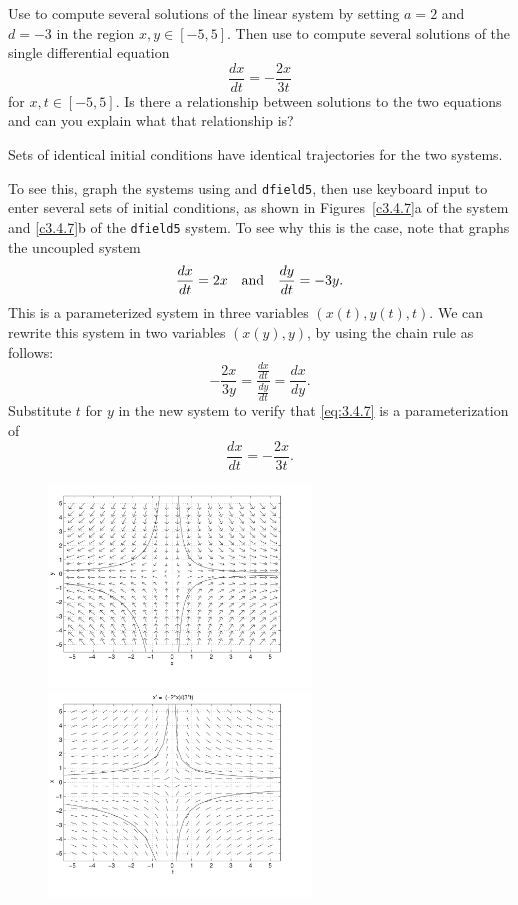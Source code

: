 \documentclass{ximera}
\begin{document}
\begin{computerExercise} \label{c3.4.7}
Use {\pplane} to compute several solutions of the linear system by
setting $a=2$ and $d=-3$ in the region $x,y\in[-5,5]$.  Then use
{\dfield} to compute several solutions of the single differential
equation
\[
\frac{dx}{dt} = -\frac{2x}{3t}
\]
for $x,t\in[-5,5]$.  Is there a relationship between solutions to the
two equations and can you explain what that relationship is?

\begin{solution}

\ans Sets of identical initial conditions have identical trajectories
for the two systems. 

\soln To see this, graph the systems using {\pplane} and
{\tt dfield5}, then use keyboard input to enter several sets of initial
conditions, as shown in Figures~\ref{c3.4.7}a of the {\pplane} system
and \ref{c3.4.7}b of the {\tt dfield5} system.  To see why this is the case,
note that {\pplane} graphs the uncoupled system
\begin{equation} \label{eq:3.4.7}
\frac{dx}{dt} = 2x \quad\mbox{and}\quad \frac{dy}{dt} = -3y.
\end{equation}
This is a parameterized system in three variables $(x(t),y(t),t)$.
We can rewrite this system in two variables $(x(y),y)$, by using the
chain rule as follows:
\[ 
-\frac{2x}{3y} = \frac{\frac{dx}{dt}}{\frac{dy}{dt}} = \frac{dx}{dy}. 
\]
Substitute $t$ for $y$ in the new system to verify that \eqref{eq:3.4.7}
is a parameterization of
\[ 
\frac{dx}{dt} = -\frac{2x}{3t}. 
\]
\begin{figure}[htb]
			\centerline{%
			\includegraphics[width=2.75in]{exfigure/3-4-7a.pdf}
			\includegraphics[width=2.75in]{exfigure/3-4-7b.pdf}}
\end{figure}
\end{solution}
\end{computerExercise}
\end{document}
